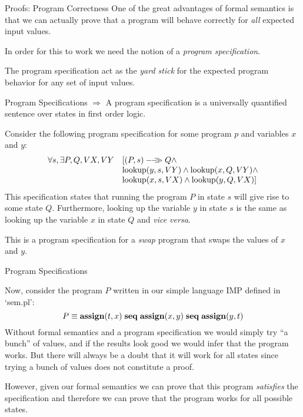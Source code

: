 \documentclass{beamer}
\begin{document}
\begin{frame}[fragile]{Proofs: Program Correctness}
One of the great advantages of formal semantics is that we can actually prove that
a program will behave correctly for {\em all} expected input values.

\vspace{.1in}

In order for this to work we need the notion of a {\em program specification}.


\vspace{.1in}

The program specification act as the {\em yard stick} for the expected program behavior
for any set of input values.

\end{frame}

\begin{frame}[fragile]{Program Specifications}
$\Rightarrow$ A program specification is a universally quantified sentence over states in first order logic.

\vspace{.1in}

Consider the following program specification for some program $p$ and variables $x$ and $y$:
\[
\begin{array}{rl}
\forall s,\exists P,Q,VX,VY& [{(P,s)}-\!\!-\!\!\!\!\gg{Q} \wedge \\
   		& {\rm lookup}(y,s,VY) \wedge {\rm lookup}(x,Q,VY)\wedge \\
	           & {\rm lookup}(x,s,VX) \wedge{\rm lookup}(y,Q,VX) ]
\end{array}
\]
This specification states that running the program $P$ in state $s$ will give rise to some state $Q$.
Furthermore, looking up the variable $y$ in state $s$ is the same as looking up the variable $x$ in
state $Q$ and {\em vice versa}.

\vspace{.1in}

This is a program specification for a {\em swap} program that swaps the values of $x$ and $y$.
\end{frame}

\begin{frame}[fragile]{Program Specifications}

Now, consider the  program $P$ written in our simple language IMP defined in `sem.pl':
\[
P \equiv {\bf assign}(t, x)\; {\bf  seq}\; {\bf assign}(x,y) \; {\bf seq}\; {\bf assign}(y, t)
\]
Without formal semantics and a program specification we would  simply try ``a bunch'' of values, and if the results
look good we would infer that the program works.  But there will always be a doubt that it will work for all states
since trying a bunch of values does not constitute a proof.

\vspace{.1in}

However, given our formal semantics we can prove that this program {\em satisfies} the specification
and therefore we can prove that the program works for all possible states.
\end{frame}
\end{document}
